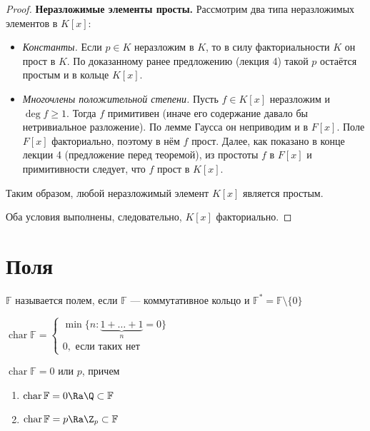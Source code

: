 \begin{proof}
    \textbf{Неразложимые элементы просты.}  
    Рассмотрим два типа неразложимых элементов в \(K[x]\):
    \begin{itemize}
        \item \textit{Константы.} Если \(p \in K\) неразложим в \(K\), то в силу факториальности \(K\) он прост в \(K\). По доказанному ранее предложению (лекция 4) такой \(p\) остаётся простым и в кольце \(K[x]\).
        \item \textit{Многочлены положительной степени.} Пусть \(f \in K[x]\) неразложим и \(\deg f \ge 1\). Тогда \(f\) примитивен (иначе его содержание давало бы нетривиальное разложение). По лемме Гаусса он неприводим и в \(F[x]\). Поле \(F[x]\) факториально, поэтому в нём \(f\) прост. Далее, как показано в конце лекции 4 (предложение перед теоремой), из простоты \(f\) в \(F[x]\) и примитивности следует, что \(f\) прост в \(K[x]\). 
    \end{itemize}
    Таким образом, любой неразложимый элемент \(K[x]\) является простым.

    Оба условия выполнены, следовательно, \(K[x]\) факториально.
\end{proof}


\section{Поля}

\begin{definition}
    \(\mathbb{F}\) называется полем, если \(\mathbb{F}\) --- коммутативное кольцо и \(\mathbb{F}^* = \mathbb{F} \setminus \{0\}\)
\end{definition}

\begin{definition}
    \(\operatorname{char} \mathbb{F} = \left\{\begin{array}{l}
        \min \{n : \underbrace{1 + \dots + 1}_{n} = 0\} \\
        0,\text{ если таких нет}
    \end{array}\right.\)
\end{definition}

\begin{note}
    \(\operatorname{char} \mathbb{F} = 0\) или \(p\), причем
    \begin{enumerate}
        \item  \(\operatorname{char} \mathbb{F} = 0 \Ra \Q \subset \mathbb{F}\)
        \item \(\operatorname{char} \mathbb{F} = p \Ra \Z_p \subset \mathbb{F}\)
    \end{enumerate}
\end{note}

